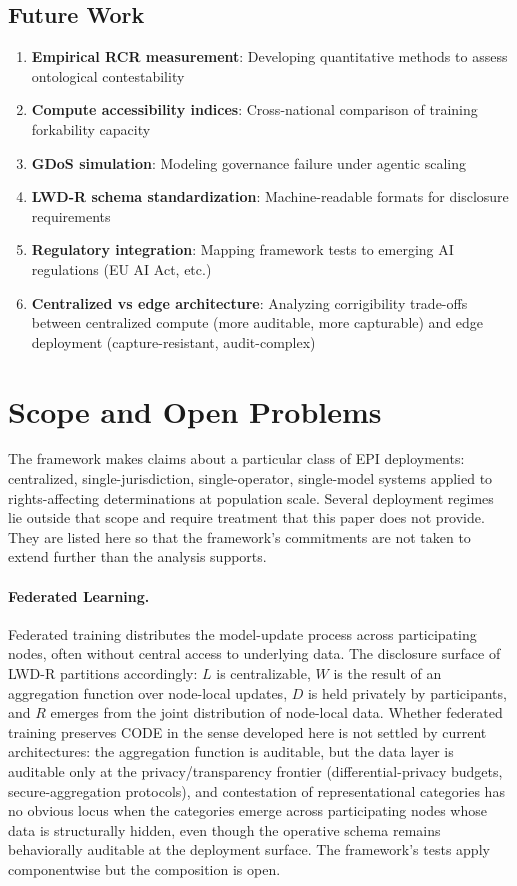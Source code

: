 \documentclass{article}
\theoremstyle{definition}
\begin{document}
\subsection{Future Work}

\begin{enumerate}[noitemsep]
    \item \textbf{Empirical RCR measurement}: Developing quantitative methods to assess ontological contestability
    \item \textbf{Compute accessibility indices}: Cross-national comparison of training forkability capacity
    \item \textbf{GDoS simulation}: Modeling governance failure under agentic scaling
    \item \textbf{LWD-R schema standardization}: Machine-readable formats for disclosure requirements
    \item \textbf{Regulatory integration}: Mapping framework tests to emerging AI regulations (EU AI Act, etc.)
    \item \textbf{Centralized vs edge architecture}: Analyzing corrigibility trade-offs between centralized compute (more auditable, more capturable) and edge deployment (capture-resistant, audit-complex)
\end{enumerate}

\section{Scope and Open Problems}
\label{sec:open-problems}

The framework makes claims about a particular class of EPI deployments: centralized, single-jurisdiction, single-operator, single-model systems applied to rights-affecting determinations at population scale. Several deployment regimes lie outside that scope and require treatment that this paper does not provide. They are listed here so that the framework's commitments are not taken to extend further than the analysis supports.

\paragraph{Federated Learning.} Federated training distributes the model-update process across participating nodes, often without central access to underlying data. The disclosure surface of LWD-R partitions accordingly: $L$ is centralizable, $W$ is the result of an aggregation function over node-local updates, $D$ is held privately by participants, and $R$ emerges from the joint distribution of node-local data. Whether federated training preserves CODE in the sense developed here is not settled by current architectures: the aggregation function is auditable, but the data layer is auditable only at the privacy/transparency frontier (differential-privacy budgets, secure-aggregation protocols), and contestation of representational categories has no obvious locus when the categories emerge across participating nodes whose data is structurally hidden, even though the operative schema remains behaviorally auditable at the deployment surface. The framework's tests apply componentwise but the composition is open.
\end{document}
